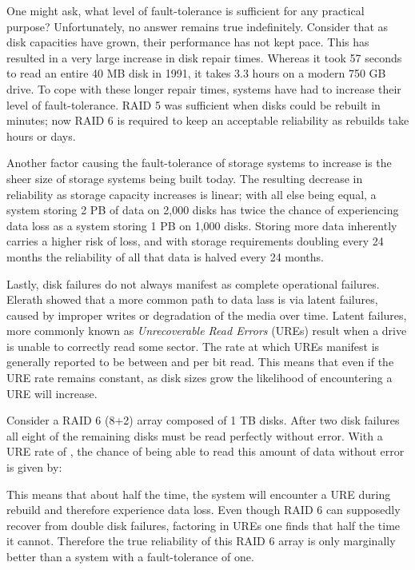 \documentclass[XXX,endnotes]{usetex-v1}
\begin{document}
One might ask, what level of fault-tolerance is sufficient for any practical purpose?  Unfortunately, no answer remains true indefinitely.  Consider that as disk capacities have grown, their performance has not kept pace.  This has resulted in a very large increase in disk repair times.  Whereas it took 57 seconds to read an entire 40 MB disk in 1991, it takes 3.3 hours on a modern 750 GB drive\cite{toms}.  To cope with these longer repair times, systems have had to increase their level of fault-tolerance.  RAID 5 was sufficient when disks could be rebuilt in minutes; now RAID 6 is required to keep an acceptable reliability as rebuilds take hours or days.

Another factor causing the fault-tolerance of storage systems to increase is the sheer size of storage systems being built today.  The resulting decrease in reliability as storage capacity increases is linear; with all else being equal, a system storing 2 PB of data on 2,000 disks has twice the chance of experiencing data loss as a system storing 1 PB on 1,000 disks\cite{reliability}.  Storing more data inherently carries a higher risk of loss, and with storage requirements doubling every 24 months\cite{idc} the reliability of all that data is halved every 24 months.

Lastly, disk failures do not always manifest as complete operational failures.  Elerath\cite{elerath} showed that a more common path to data lass is via latent failures, caused by improper writes or degradation of the media over time.  Latent failures, more commonly known as \emph{Unrecoverable Read Errors} (UREs) result when a drive is unable to correctly read some sector.  The rate at which UREs manifest is generally reported to be between  and  per bit read.  This means that even if the URE rate remains constant, as disk sizes grow the likelihood of encountering a URE will increase.

Consider a RAID 6 (8+2) array composed of 1 TB disks.  After two disk failures all eight of the remaining disks must be read perfectly without error.  With a URE rate of , the chance of being able to read this amount of data without error is given by:


This means that about half the time, the system will encounter a URE during rebuild and therefore experience data loss.  Even though RAID 6 can supposedly recover from double disk failures, factoring in UREs one finds that half the time it cannot.  Therefore the true reliability of this RAID 6 array is only marginally better than a system with a fault-tolerance of one.
\end{document}
